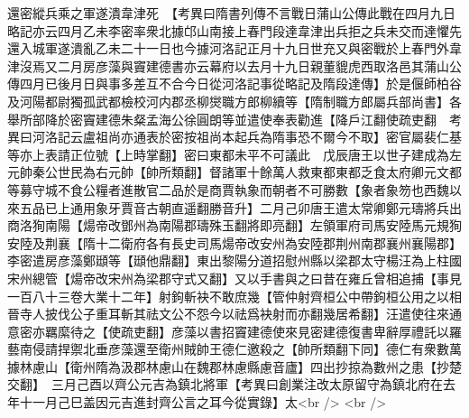 還密縱兵乘之軍遂潰韋津死　【考異曰隋書列傳不言戰日蒲山公傳此戰在四月九日略記亦云四月乙未李密率衆北據邙山南接上春門段達韋津出兵拒之兵未交而達懼先還入城軍遂潰亂乙未二十一日也今據河洛記正月十九日世充又與密戰於上春門外韋津沒焉又二月房彦藻與竇建德書亦云幕府以去月十九日親董貔虎西取洛邑其蒲山公傳四月已後月日與事多差互不合今日從河洛記事從略記及隋段達傳】於是偃師柏谷及河陽都尉獨孤武都檢校河内郡丞柳爕職方郎柳續等【隋制職方郎屬兵部尚書】各舉所部降於密竇建德朱粲孟海公徐圓朗等並遣使奉表勸進【降戶江翻使疏吏翻　考異曰河洛記云盧祖尚亦通表於密按祖尚本起兵為隋事恐不爾今不取】密官屬裴仁基等亦上表請正位號【上時掌翻】密曰東都未平不可議此　戊辰唐王以世子建成為左元帥秦公世民為右元帥【帥所類翻】督諸軍十餘萬人救東都東都乏食太府卿元文都等募守城不食公糧者進散官二品於是商賈執象而朝者不可勝數【象者象笏也西魏以來五品已上通用象牙賈音古朝直遥翻勝音升】二月己卯唐王遣太常卿鄭元璹將兵出商洛狥南陽【煬帝改鄧州為南陽郡璹殊玉翻將即亮翻】左領軍府司馬安陸馬元規狥安陸及荆襄【隋十二衛府各有長史司馬煬帝改安州為安陸郡荆州南郡襄州襄陽郡】李密遣房彦藻鄭頲等【頲他鼎翻】東出黎陽分道招慰州縣以梁郡太守楊汪為上柱國宋州總管【煬帝改宋州為梁郡守式又翻】又以手書與之曰昔在雍丘曾相追捕【事見一百八十三卷大業十二年】射鉤斬袂不敢庶幾【管仲射齊桓公中帶鉤桓公用之以相晉寺人披伐公子重耳斬其祛文公不怨今以祛爲袂射而亦翻幾居希翻】汪遣使往來通意密亦羈縻待之【使疏吏翻】彦藻以書招竇建德使來見密建德復書卑辭厚禮託以羅藝南侵請捍禦北垂彦藻還至衛州賊帥王德仁邀殺之【帥所類翻下同】德仁有衆數萬據林慮山【衛州隋為汲郡林慮山在魏郡林慮縣慮音廬】四出抄掠為數州之患【抄楚交翻】　三月己酉以齊公元吉為鎮北將軍【考異曰創業注改太原留守為鎮北府在去年十一月己巳盖因元吉進封齊公言之耳今從實錄】太<br />
<br />
